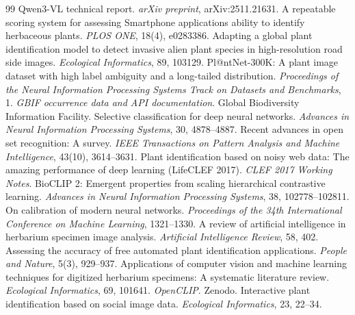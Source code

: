\documentclass[preprint,12pt,authoryear]{elsarticle}
\begin{document}
\begin{thebibliography}{99}
 Qwen3-VL technical report. \emph{arXiv preprint}, arXiv:2511.21631.
 A repeatable scoring system for assessing Smartphone applications ability to identify herbaceous plants. \emph{PLOS ONE}, 18(4), e0283386.
 Adapting a global plant identification model to detect invasive alien plant species in high-resolution road side images. \emph{Ecological Informatics}, 89, 103129.
 Pl@ntNet-300K: A plant image dataset with high label ambiguity and a long-tailed distribution. \emph{Proceedings of the Neural Information Processing Systems Track on Datasets and Benchmarks}, 1.
 \emph{GBIF occurrence data and API documentation}. Global Biodiversity Information Facility.
 Selective classification for deep neural networks. \emph{Advances in Neural Information Processing Systems}, 30, 4878--4887.
 Recent advances in open set recognition: A survey. \emph{IEEE Transactions on Pattern Analysis and Machine Intelligence}, 43(10), 3614--3631.
 Plant identification based on noisy web data: The amazing performance of deep learning (LifeCLEF 2017). \emph{CLEF 2017 Working Notes}.
 BioCLIP 2: Emergent properties from scaling hierarchical contrastive learning. \emph{Advances in Neural Information Processing Systems}, 38, 102778--102811.
 On calibration of modern neural networks. \emph{Proceedings of the 34th International Conference on Machine Learning}, 1321--1330.
 A review of artificial intelligence in herbarium specimen image analysis. \emph{Artificial Intelligence Review}, 58, 402.
 Assessing the accuracy of free automated plant identification applications. \emph{People and Nature}, 5(3), 929--937.
 Applications of computer vision and machine learning techniques for digitized herbarium specimens: A systematic literature review. \emph{Ecological Informatics}, 69, 101641.
 \emph{OpenCLIP}. Zenodo.
 Interactive plant identification based on social image data. \emph{Ecological Informatics}, 23, 22--34.

\end{thebibliography}
\end{document}
